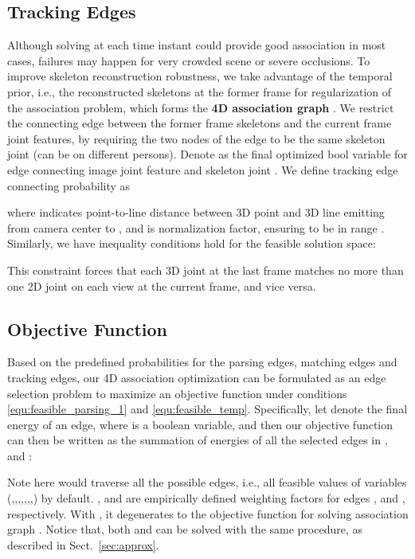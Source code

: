 \documentclass[10pt,twocolumn,letterpaper]{article}
\begin{document}
\subsection{Tracking Edges}
\label{sec:sec:tr_graph}




Although solving  at each time instant could provide good association in most cases, failures may happen for very crowded scene or severe occlusions. To improve skeleton reconstruction robustness, we take advantage of the temporal prior, i.e., the reconstructed skeletons at the former frame for regularization of the association problem, which forms the \textbf{4D association graph} . We restrict the connecting edge between the former frame skeletons and the current frame joint features, by requiring the two nodes of the edge to be the same skeleton joint (can be on different persons). Denote  as the final optimized bool variable for edge connecting image joint feature  and skeleton joint . We define tracking edge connecting probability as

where  indicates point-to-line distance between 3D point  and 3D line emitting from camera center to , and  is normalization factor, ensuring  to be in range . 
Similarly, we have inequality conditions hold for the feasible solution space:

This constraint forces that each 3D joint at the last frame matches no more than one 2D joint on each view at the current frame, and vice versa.
 
\subsection{Objective Function}
Based on the predefined probabilities for the parsing edges, matching edges and tracking edges, our 4D association optimization can be formulated as an edge selection problem to maximize an objective function under conditions \ref{equ:feasible_parsing_1} and \ref{equ:feasible_temp}. Specifically, let  denote the final energy of an edge, where  is a boolean variable, and then our objective function can then be written as the summation of energies of all the selected edges in ,  and : 

Note here  would traverse all the possible edges, i.e., all feasible values of variables (,,,,,,,) by default. ,  and  are empirically defined weighting factors for edges ,  and , respectively. 
With , it degenerates to the objective function for solving association graph . Notice that, both  and  can be solved with the same procedure, as described in Sect.~\ref{sec:approx}.
\end{document}
